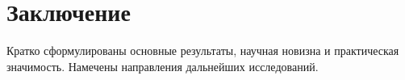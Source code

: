 \chapter*{Заключение}
Кратко сформулированы основные результаты, научная новизна и практическая значимость. Намечены направления дальнейших исследований.


